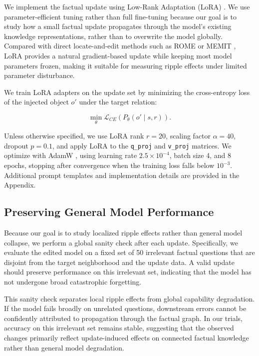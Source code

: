We implement the factual update using Low-Rank Adaptation (LoRA) \cite{hu2021lora}. We use parameter-efficient tuning rather than full fine-tuning because our goal is to study how a small factual update propagates through the model's existing knowledge representations, rather than to overwrite the model globally. Compared with direct locate-and-edit methods such as ROME or MEMIT \cite{meng2022locating}, LoRA provides a natural gradient-based update while keeping most model parameters frozen, making it suitable for measuring ripple effects under limited parameter disturbance.

We train LoRA adapters on the update set by minimizing the cross-entropy loss of the injected object $o'$ under the target relation:

\[
\min_{\theta} \mathcal{L}_{CE}(P_{\theta}(o' \mid s,r)).
\]

Unless otherwise specified, we use LoRA rank $r=20$, scaling factor $\alpha=40$, dropout $p=0.1$, and apply LoRA to the \texttt{q\_proj} and \texttt{v\_proj} matrices. We optimize with AdamW \cite{loshchilov2019decoupled}, using learning rate $2.5 \times 10^{-4}$, batch size 4, and 8 epochs, stopping after convergence when the training loss falls below $10^{-3}$. Additional prompt templates and implementation details are provided in the Appendix.

\subsection{Preserving General Model Performance}

Because our goal is to study localized ripple effects rather than general model collapse, we perform a global sanity check after each update. Specifically, we evaluate the edited model on a fixed set of 50 irrelevant factual questions that are disjoint from the target neighborhood and the update data. A valid update should preserve performance on this irrelevant set, indicating that the model has not undergone broad catastrophic forgetting.

This sanity check separates local ripple effects from global capability degradation. If the model fails broadly on unrelated questions, downstream errors cannot be confidently attributed to propagation through the factual graph. In our trials, accuracy on this irrelevant set remains stable, suggesting that the observed changes primarily reflect update-induced effects on connected factual knowledge rather than general model degradation.

